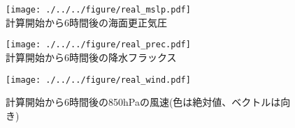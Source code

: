 \begin{figure}[h]
\begin{center}
  \texttt{[image: ./../../figure/real\_mslp.pdf]}\\
  \caption{計算開始から6時間後の海面更正気圧}
  \label{fig:real_mslp}
\end{center}
\begin{center}
  \texttt{[image: ./../../figure/real\_prec.pdf]}\\
  \caption{計算開始から6時間後の降水フラックス}
  \label{fig:real_prec}
\end{center}
\begin{center}
  \texttt{[image: ./../../figure/real\_wind.pdf]}\\
  \caption{計算開始から6時間後の850hPaの風速(色は絶対値、ベクトルは向き)}
  \label{fig:real_wind}
\end{center}
\end{figure}
